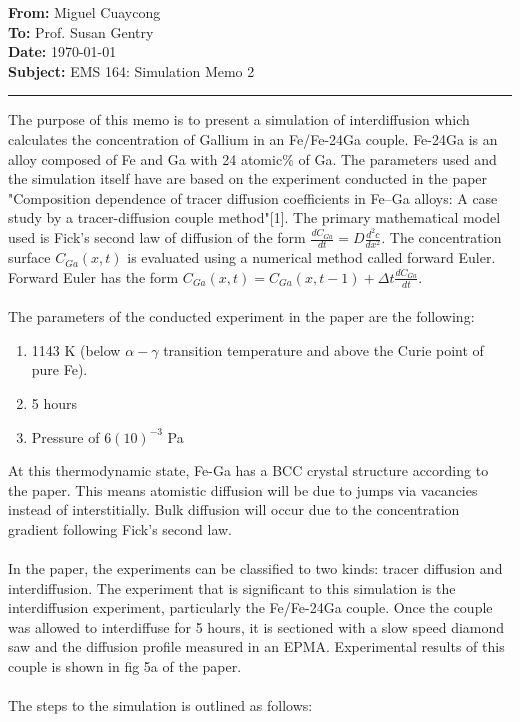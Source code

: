\documentclass[11pt]{article}
\newcommand{\memoheader}[4]{
  \noindent
  \textbf{From:} #2\\ 
  \textbf{To:} #1\\
  \textbf{Date:} #3\\
  \textbf{Subject:} #4\\[1ex]\hrule\vspace{1.5ex}
}
\begin{document}
\memoheader{Prof. Susan Gentry}
            {Miguel Cuaycong}
            {\today}
            {EMS 164: Simulation Memo 2}



\noindent The purpose of this memo is to present a simulation of interdiffusion which calculates the concentration of Gallium 
in an Fe/Fe-24Ga couple. Fe-24Ga is an alloy composed of Fe and Ga with 24 atomic\% of Ga. 
The parameters used and the simulation itself have are based on the experiment conducted in the paper "Composition dependence of tracer diffusion coefficients in Fe–Ga
alloys: A case study by a tracer-diffusion couple method"[1].
The primary mathematical model used is Fick's second law of diffusion of the form $\frac{dC_{Ga}}{dt} = D \frac{d^2c}{dx^2}$. 
The concentration surface $C_{Ga}(x,t)$ is evaluated using a numerical method called forward Euler.
Forward Euler has the form $C_{Ga}(x,t) = C_{Ga}(x, t-1) + \Delta t \frac{dC_{Ga}}{dt}$.
\\~\\
The parameters of the conducted experiment in the paper are the following: 
\begin{enumerate}
  \item 1143 K (below $\alpha-\gamma$ transition temperature and above the Curie point of pure Fe).
  \item 5 hours
  \item Pressure of $6(10)^{-3}$ Pa
\end{enumerate}
At this thermodynamic state, Fe-Ga has a BCC crystal structure according to the paper. This means atomistic diffusion will be due to jumps via vacancies instead of interstitially.
Bulk diffusion will occur due to the concentration gradient following Fick's second law. 
\\~\\
In the paper, the experiments can be classified to two kinds: tracer diffusion and interdiffusion. 
The experiment that is significant to this simulation is the interdiffusion experiment, particularly the Fe/Fe-24Ga couple.
Once the couple was allowed to interdiffuse for 5 hours, it is sectioned with a slow speed diamond saw and the diffusion profile measured in an EPMA.
Experimental results of this couple is shown in fig 5a of the paper.
\\~\\
The steps to the simulation is outlined as follows:
\end{document}
